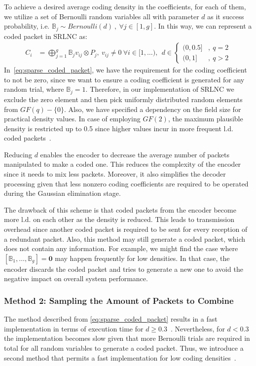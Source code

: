 To achieve a desired average coding density in the coefficients, for each
of them, we utilize a set of Bernoulli random variables all with parameter
$d$ as it success probability, i.e. $\mathbb{B}_j \sim Bernoulli(d)\ ,\ \forall
j \in [1,g]$. In this way, we can represent a coded packet in \ac{SRLNC} as:
%
\begin{align} \label{eq:sparse_coded_packet}
    C_i  &= \bigoplus_{j=1}^{g} \mathbb{B}_j v_{ij} \otimes P_j ,\ v_{ij}
    \neq 0\
    \forall i \in [1,\ldots) ,\ \
    d \in
    \begin{cases}
        {(0,0.5]} & ,\ q = 2 \\
        {(0,1]}   & ,\ q > 2
    \end{cases}
\end{align}
%
In~\eqref{eq:sparse_coded_packet}, we have the requirement for the
coding coefficient to not be zero, since we want to ensure a coding
coefficient is generated for any random trial, where
$\mathbb{B}_j = 1$. Therefore, in our implementation of \ac{SRLNC} we
exclude the zero element and then pick uniformly distributed random
elements from $GF(q)-\{ 0 \}$. Also, we have specified a dependency on
the field size for practical density values. In case of employing
$GF(2)$, the maximum plausible density is restricted up to 0.5 since
higher values incur in more frequent \ac{l.d.} coded
packets~\cite{realworld_nc2013}.

Reducing $d$ enables the encoder to decrease the average number of
packets manipulated to make a coded one. This reduces the complexity
of the encoder since it needs to mix less packets. Moreover, it also
simplifies the decoder processing given that less nonzero coding
coefficients are required to be operated during the Gaussian
elimination stage.

The drawback of this scheme is that coded packets from the encoder
become more \ac{l.d.} on each other as the density is reduced.  This
leads to transmission overhead since another coded packet is required
to be sent for every reception of a redundant packet.  Also, this
method may still generate a coded packet, which does not contain any
information. For example, we might find the case where
$\left[\mathbb{B}_1, \ldots, \mathbb{B}_g \right] = \mathbf{0}$ may
happen frequently for low densities. In that case, the encoder
discards the coded packet and tries to generate a new one to avoid the
negative impact on overall system performance.

\subsubsection{Method 2: Sampling the Amount of Packets to Combine}
The method described from \eqref{eq:sparse_coded_packet} results
in a fast implementation in terms of execution time for
$d \geq 0.3$~\cite{practicalview_tsnc2015}. Nevertheless, for $d < 0.3$
the implementation becomes slow given that more Bernoulli trials are
required in total for all random variables to generate a coded packet.
Thus, we introduce a second method that permits a fast implementation
for low coding densities~\cite{practicalview_tsnc2015}.

